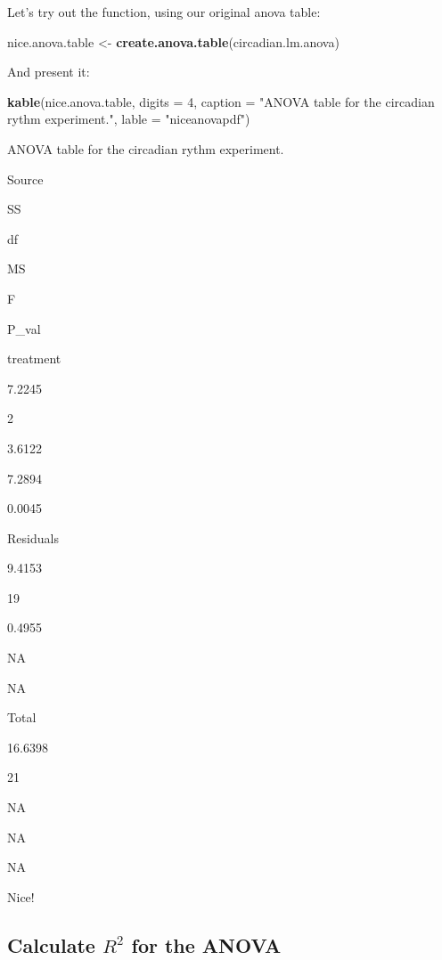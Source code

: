 \documentclass[
]{book}
\newenvironment{Shaded}{\begin{snugshade}}{\end{snugshade}}
\newcommand{\AttributeTok}[1]{\textcolor[rgb]{0.13,0.29,0.53}{#1}}
\newcommand{\DecValTok}[1]{\textcolor[rgb]{0.00,0.00,0.81}{#1}}
\newcommand{\FunctionTok}[1]{\textcolor[rgb]{0.13,0.29,0.53}{\textbf{#1}}}
\newcommand{\NormalTok}[1]{#1}
\newcommand{\OtherTok}[1]{\textcolor[rgb]{0.56,0.35,0.01}{#1}}
\newcommand{\StringTok}[1]{\textcolor[rgb]{0.31,0.60,0.02}{#1}}
\begin{document}
Let's try out the function, using our original anova table:

\begin{Shaded}
\begin{Highlighting}[]
\NormalTok{nice.anova.table }\OtherTok{\textless{}{-}} \FunctionTok{create.anova.table}\NormalTok{(circadian.lm.anova)}
\end{Highlighting}
\end{Shaded}

And present it:

\begin{Shaded}
\begin{Highlighting}[]
\FunctionTok{kable}\NormalTok{(nice.anova.table, }\AttributeTok{digits =} \DecValTok{4}\NormalTok{, }
      \AttributeTok{caption =} \StringTok{"ANOVA table for the circadian rythm experiment."}\NormalTok{, }
      \AttributeTok{lable =} \StringTok{"niceanovapdf"}\NormalTok{)}
\end{Highlighting}
\end{Shaded}

\label{tab:niceanovapdf}ANOVA table for the circadian rythm experiment.

Source

SS

df

MS

F

P\_val

treatment

7.2245

2

3.6122

7.2894

0.0045

Residuals

9.4153

19

0.4955

NA

NA

Total

16.6398

21

NA

NA

NA

Nice!

\subsection{\texorpdfstring{Calculate \(R^2\) for the ANOVA}{Calculate R\^{}2 for the ANOVA}}\label{calculate-r2-for-the-anova}
\end{document}
